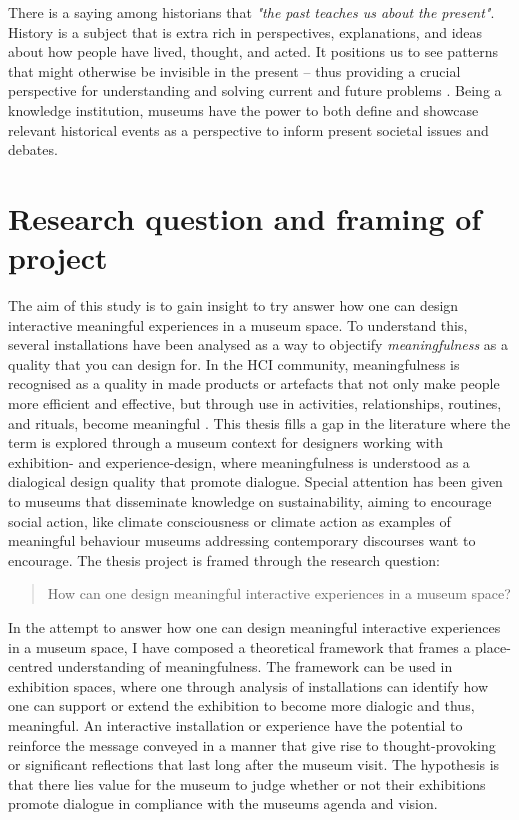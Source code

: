 There is a saying among historians that \emph{"the past teaches us about the present"}. History is a subject that is extra rich in perspectives, explanations, and ideas about how people have lived, thought, and acted. It positions us to see patterns that might otherwise be invisible in the present – thus providing a crucial perspective for understanding and solving current and future problems \autocite{UW_website}. Being a knowledge institution, museums have the power to both define and showcase relevant historical events as a perspective to inform present societal issues and debates.

\section{Research question and framing of project}
The aim of this study is to gain insight to try answer how one can design interactive meaningful experiences in a museum space. To understand this, several installations have been analysed as a way to objectify \emph{meaningfulness} as a quality that you can design for. In the HCI community, meaningfulness is recognised as a quality in made products or artefacts that not only make people more efficient and effective, but through use in activities, relationships, routines, and rituals, become meaningful \autocite{zimmerman_designing_2009}. This thesis fills a gap in the literature where the term is explored through a museum context for designers working with exhibition- and experience-design, where meaningfulness is understood as a dialogical design quality that promote dialogue. Special attention has been given to museums that disseminate knowledge on sustainability, aiming to encourage social action, like climate consciousness or climate action as examples of meaningful behaviour museums addressing contemporary discourses want to encourage. The thesis project is framed through the research question:

\begin{quote}
    How can one design meaningful interactive experiences in a museum space?
\end{quote}

In the attempt to answer how one can design meaningful interactive experiences in a museum space, I have composed a theoretical framework that frames a place-centred understanding of meaningfulness. The framework can be used in exhibition spaces, where one through analysis of installations can identify how one can support or extend the exhibition to become more dialogic and thus, meaningful. An interactive installation or experience have the potential to reinforce the message conveyed in a manner that give rise to thought-provoking or significant reflections that last long after the museum visit. The hypothesis is that there lies value for the museum to judge whether or not their exhibitions promote dialogue in compliance with the museums agenda and vision.

